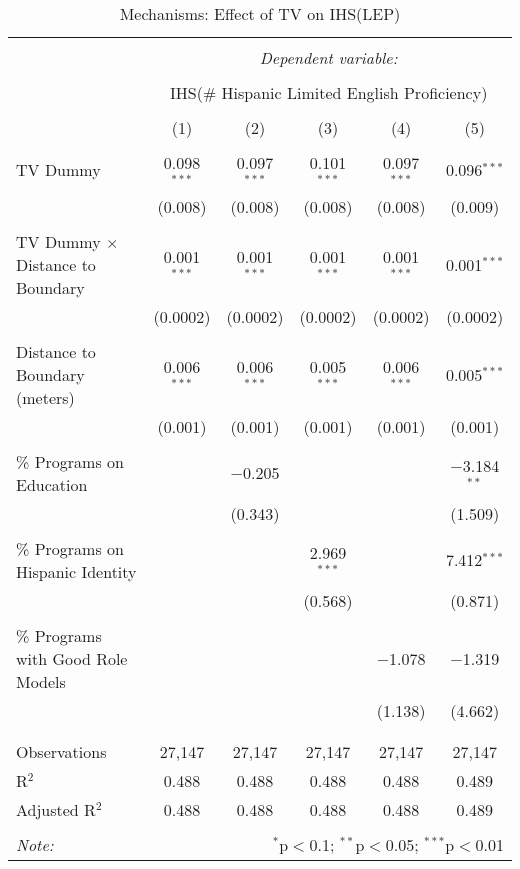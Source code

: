 
\begin{table}[!htbp] \centering 
  \caption{Mechanisms: Effect of TV on IHS(LEP)} 
  \label{} 
\begin{tabular}{@{\extracolsep{-2pt}}lccccc} 
\\[-1.8ex]\hline 
\hline \\[-1.8ex] 
 & \multicolumn{5}{c}{\textit{Dependent variable:}} \\ 
\cline{2-6} 
\\[-1.8ex] & \multicolumn{5}{c}{IHS(\# Hispanic Limited English Proficiency)} \\ 
\\[-1.8ex] & (1) & (2) & (3) & (4) & (5)\\ 
\hline \\[-1.8ex] 
 TV Dummy & 0.098$^{***}$ & 0.097$^{***}$ & 0.101$^{***}$ & 0.097$^{***}$ & 0.096$^{***}$ \\ 
  & (0.008) & (0.008) & (0.008) & (0.008) & (0.009) \\ 
  & & & & & \\ 
 TV Dummy $\times$ Distance to Boundary & 0.001$^{***}$ & 0.001$^{***}$ & 0.001$^{***}$ & 0.001$^{***}$ & 0.001$^{***}$ \\ 
  & (0.0002) & (0.0002) & (0.0002) & (0.0002) & (0.0002) \\ 
  & & & & & \\ 
 Distance to Boundary (meters) & 0.006$^{***}$ & 0.006$^{***}$ & 0.005$^{***}$ & 0.006$^{***}$ & 0.005$^{***}$ \\ 
  & (0.001) & (0.001) & (0.001) & (0.001) & (0.001) \\ 
  & & & & & \\ 
 \% Programs on Education &  & $-$0.205 &  &  & $-$3.184$^{**}$ \\ 
  &  & (0.343) &  &  & (1.509) \\ 
  & & & & & \\ 
 \% Programs on Hispanic Identity &  &  & 2.969$^{***}$ &  & 7.412$^{***}$ \\ 
  &  &  & (0.568) &  & (0.871) \\ 
  & & & & & \\ 
 \% Programs with Good Role Models &  &  &  & $-$1.078 & $-$1.319 \\ 
  &  &  &  & (1.138) & (4.662) \\ 
  & & & & & \\ 
\hline \\[-1.8ex] 
Observations & 27,147 & 27,147 & 27,147 & 27,147 & 27,147 \\ 
R$^{2}$ & 0.488 & 0.488 & 0.488 & 0.488 & 0.489 \\ 
Adjusted R$^{2}$ & 0.488 & 0.488 & 0.488 & 0.488 & 0.489 \\ 
\hline 
\hline \\[-1.8ex] 
\textit{Note:}  & \multicolumn{5}{r}{$^{*}$p$<$0.1; $^{**}$p$<$0.05; $^{***}$p$<$0.01} \\ 
\end{tabular} 
\end{table} 
